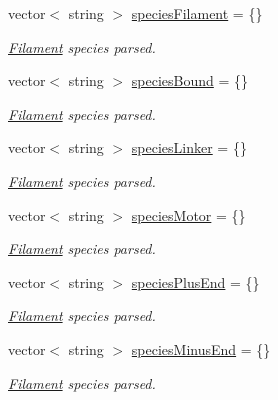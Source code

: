 {\bf }\par
\begin{DoxyCompactItemize}
\item 
vector$<$ string $>$ \hyperlink{structChemistryData_a3389b17268aaefcba28539ec3b5e5e35}{species\+Filament} = \{\}
\begin{DoxyCompactList}\small\item\em \hyperlink{classFilament}{Filament} species parsed. \end{DoxyCompactList}\item 
vector$<$ string $>$ \hyperlink{structChemistryData_acab0ca129148f43eaa33847782411b3a}{species\+Bound} = \{\}
\begin{DoxyCompactList}\small\item\em \hyperlink{classFilament}{Filament} species parsed. \end{DoxyCompactList}\item 
vector$<$ string $>$ \hyperlink{structChemistryData_ab41e13ef134b8cb9066fff74ece920ca}{species\+Linker} = \{\}
\begin{DoxyCompactList}\small\item\em \hyperlink{classFilament}{Filament} species parsed. \end{DoxyCompactList}\item 
vector$<$ string $>$ \hyperlink{structChemistryData_a273fd2565deae219bbd1fe3d557f53ba}{species\+Motor} = \{\}
\begin{DoxyCompactList}\small\item\em \hyperlink{classFilament}{Filament} species parsed. \end{DoxyCompactList}\item 
vector$<$ string $>$ \hyperlink{structChemistryData_a627b89ad8dad87e03d249e5dc56eff5a}{species\+Plus\+End} = \{\}
\begin{DoxyCompactList}\small\item\em \hyperlink{classFilament}{Filament} species parsed. \end{DoxyCompactList}\item 
vector$<$ string $>$ \hyperlink{structChemistryData_a8b638671871e8cc1ef65f2c7429d6254}{species\+Minus\+End} = \{\}
\begin{DoxyCompactList}\small\item\em \hyperlink{classFilament}{Filament} species parsed. \end{DoxyCompactList}\end{DoxyCompactItemize}



